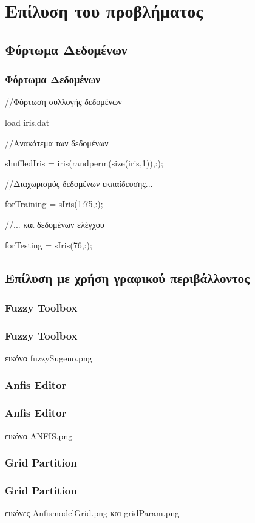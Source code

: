 \documentclass[xetex,serif,mathserif,14pt]{beamer}
\begin{document}

\section{Επίλυση του προβλήματος}

\subsection{Φόρτωμα Δεδομένων}

\begin{frame}
\frametitle{Φόρτωμα Δεδομένων}
    //Φόρτωση συλλογής δεδομένων

    load iris.dat

    //Ανακάτεμα  των δεδομένων

    shuffledIris = iris(randperm(size(iris,1)),:);

    //Διαχωρισμός δεδομένων εκπαίδευσης...

    forTraining = sIris(1:75,:);

    //... και δεδομένων ελέγχου

    forTesting = sIris(76,:);
\end{frame}

\subsection{Επίλυση με χρήση γραφικού περιβάλλοντος}

\subsubsection{Fuzzy Toolbox}
\begin{frame}
\frametitle{Fuzzy Toolbox}
εικόνα fuzzySugeno.png
\end{frame}

\subsubsection{Anfis Editor}
\begin{frame}
\frametitle{Anfis Editor}
εικόνα ANFIS.png
\end{frame}

\subsubsection{Grid Partition}
\begin{frame}
\frametitle{Grid Partition}
εικόνες AnfismodelGrid.png και gridParam.png
\end{frame}
\end{document}
